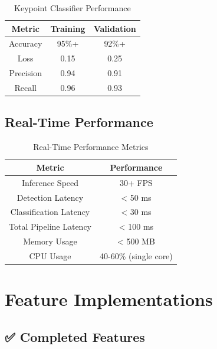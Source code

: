 \begin{table}[H]
\centering
\begin{tabular}{|c|c|c|}
\hline
\textbf{Metric} & \textbf{Training} & \textbf{Validation} \\
\hline
Accuracy & 95\%+ & 92\%+ \\
\hline
Loss & 0.15 & 0.25 \\
\hline
Precision & 0.94 & 0.91 \\
\hline
Recall & 0.96 & 0.93 \\
\hline
\end{tabular}
\caption{Keypoint Classifier Performance}
\end{table}

\subsection{Real-Time Performance}

\begin{table}[H]
\centering
\begin{tabular}{|c|c|}
\hline
\textbf{Metric} & \textbf{Performance} \\
\hline
Inference Speed & 30+ FPS \\
\hline
Detection Latency & < 50 ms \\
\hline
Classification Latency & < 30 ms \\
\hline
Total Pipeline Latency & < 100 ms \\
\hline
Memory Usage & < 500 MB \\
\hline
CPU Usage & 40-60\% (single core) \\
\hline
\end{tabular}
\caption{Real-Time Performance Metrics}
\end{table}

\section{Feature Implementations}

\subsection{✅ Completed Features}

